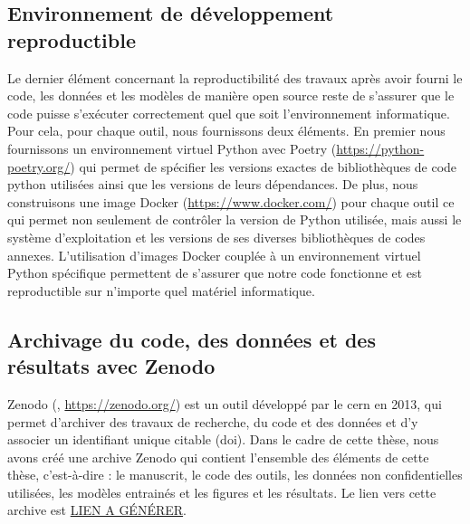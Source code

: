 \subsection{Environnement de développement reproductible}
Le dernier élément concernant la reproductibilité des travaux après avoir fourni le code, les données et les modèles de manière open source reste de s'assurer que le code puisse s'exécuter correctement quel que soit l'environnement informatique. Pour cela, pour chaque outil, nous fournissons deux éléments. En premier nous fournissons un environnement virtuel Python avec Poetry (\url{https://python-poetry.org/}) qui permet de spécifier les versions exactes de bibliothèques de code python utilisées ainsi que les versions de leurs dépendances. De plus, nous construisons une image Docker (\url{https://www.docker.com/}) pour chaque outil ce qui permet non seulement de contrôler la version de Python utilisée, mais aussi le système d'exploitation et les versions de ses diverses bibliothèques de codes annexes. L'utilisation d'images Docker couplée à un environnement virtuel Python spécifique permettent de s'assurer que notre code fonctionne et est reproductible sur n'importe quel matériel informatique.

\subsection{Archivage du code, des données et des résultats avec Zenodo}
Zenodo  (\cite{european_organization_for_nuclear_research_zenodo_2013}, \url{https://zenodo.org/}) est un outil développé par le \gls{cern} en 2013, qui permet d'archiver des travaux de recherche, du code et des données et d'y associer un identifiant unique citable (\gls{doi}). Dans le cadre de cette thèse, nous avons créé une archive Zenodo qui contient l'ensemble des éléments de cette thèse, c'est-à-dire : le manuscrit, le code des outils, les données non confidentielles utilisées, les modèles entrainés et les figures et les résultats. Le lien vers cette archive est \url{LIEN A GÉNÉRER}.